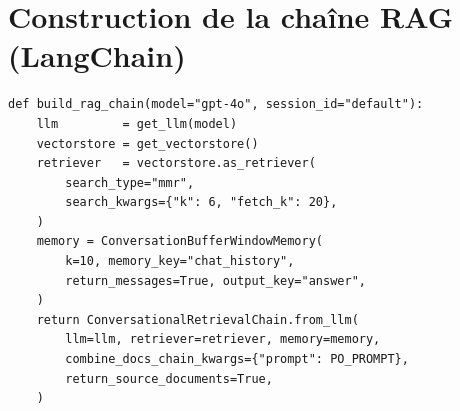 \section{Construction de la chaîne RAG (LangChain)}
\begin{lstlisting}[caption={Pipeline RAG avec mémoire conversationnelle.}]
def build_rag_chain(model="gpt-4o", session_id="default"):
    llm         = get_llm(model)
    vectorstore = get_vectorstore()
    retriever   = vectorstore.as_retriever(
        search_type="mmr",
        search_kwargs={"k": 6, "fetch_k": 20},
    )
    memory = ConversationBufferWindowMemory(
        k=10, memory_key="chat_history",
        return_messages=True, output_key="answer",
    )
    return ConversationalRetrievalChain.from_llm(
        llm=llm, retriever=retriever, memory=memory,
        combine_docs_chain_kwargs={"prompt": PO_PROMPT},
        return_source_documents=True,
    )
\end{lstlisting}
